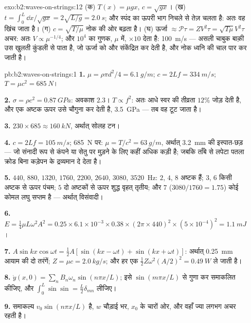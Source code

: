 \begin{solution}{exo:b2:waves-on-strings:12}
(क) $T(x) = \mu gx$, $c = \sqrt{gx}$। (ख) $t = \int_0^L\dd x/\sqrt{gx} = 2\sqrt{L/g} =
\qty{2.0}{s}$; और स्पंद का ऊपरी भाग निचले से तेज़ चलता है: अतः वह
खिंच जाता है। (ग) $c = \sqrt{T/\mu}$ नोक की ओर बढ़ता है। (घ) ऊर्जा $\approx
\mathcal P\tau = ZV^2\tau = \sqrt{T\mu}V^2\tau$ अचर: अतः $V \propto \mu^{-1/4}$; और
$10^4$ का गुणक, $\mu$ में, $\times10$ देता है: \qty{100}{m/s} --- असली चाबुक
बाक़ी उस खुलती कुंडली से पाता है, जो ऊर्जा को और संकेंद्रित कर देती है,
और नोक ध्वनि की चाल पार कर जाती है।
\end{solution}

\begin{solution}{pb:b2:waves-on-strings:1}
\textbf{1.} $\mu = \rho\pi d^2/4 = \qty{6.1}{g/m}$; $c = 2Lf = \qty{334}{m/s}$; $T = \mu c^2
= \qty{685}{N}$।

\textbf{2.} $\sigma = \rho c^2 = \qty{0.87}{GPa}$: अवकाश $2.3$। $T \propto f^2$: अतः
आधे स्वर की तीव्रता $12\%$ जोड़ देती है, और एक अष्टक ऊपर उसे चौगुना कर देती है,
\qty{3.5}{GPa} --- तब वह टूट जाता है।

\textbf{3.} $230 \times 685 \approx \qty{160}{kN}$, अर्थात् सोलह टन।

\textbf{4.} $c = 2Lf = \qty{105}{m/s}$; \qty{685}{N} पर: $\mu = T/c^2 = \qty{63}{g/m}$,
अर्थात् \qty{3.2}{mm} की इस्पात-छड़ --- जो संनादी रूप से कंपने या सेतु पर
मुड़ने के लिए कहीं अधिक कड़ी है; जबकि ताँबे से लपेटा पतला क्रोड
बिना कड़ेपन के द्रव्यमान दे देता है।

\textbf{5.} $440$, $880$, $1320$, $1760$, $2200$, $2640$, $3080$, \qty{3520}{Hz}: $2$,
$4$, $8$ अष्टक हैं; $3$, $6$ किसी अष्टक से ऊपर पंचम; $5$ दो अष्टकों से ऊपर
शुद्ध वृहत् तृतीय; और $7$ ($3080/1760 = 1.75$) कोई कोमल लघु
सप्तम है --- अर्थात् विसंवादी।

\textbf{6.} $E = \tfrac14\mu L\omega^2A^2 = 0.25 \times 6.1 \times 10^{-3} \times 0.38 \times (2\pi
\times 440)^2 \times (5 \times 10^{-4})^2 = \qty{1.1}{mJ}$।

\textbf{7.} $A\sin kx\cos\omega t = \tfrac12A[\sin(kx - \omega t) + \sin(kx + \omega t)]$: अर्थात्
\qty{0.25}{mm} आयाम की दो तरंगें; $Z = \mu c = \qty{2.0}{kg/s}$; और हर एक
$\tfrac12Z\omega^2(A/2)^2 = \qty{0.49}{W}$ ले जाती है।

\textbf{8.} $\dot y(x, 0) = \sum_nB_n\omega_n\sin(n\pi x/L)$; इसे
$\sin(m\pi x/L)$ से गुणा कर समाकलित कीजिए, और $\int_0^L\sin\sin = \tfrac L2\delta_{mn}$ लीजिए।

\textbf{9.} समाकल्य $v_0\sin(n\pi x/L)$ है, $w$ चौड़ाई भर, $x_0$ के चारों ओर,
और वहाँ ज्या लगभग अचर रहती है।


\end{solution}
